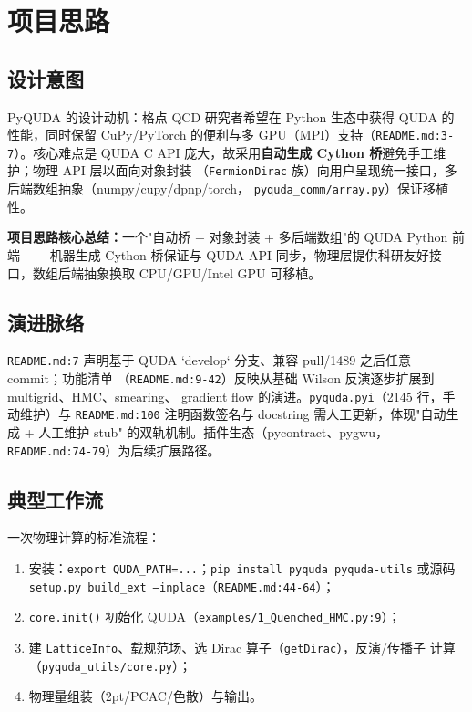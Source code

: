 \documentclass[UTF8]{ctexart}
\begin{document}
\section{项目思路}

\subsection{设计意图}
PyQUDA 的设计动机：格点 QCD 研究者希望在 Python 生态中获得 QUDA 的性能，同时保留
CuPy/PyTorch 的便利与多 GPU（MPI）支持（\texttt{README.md:3-7}）。核心难点是 QUDA C API
庞大，故采用\textbf{自动生成 Cython 桥}避免手工维护；物理 API 层以面向对象封装
（\texttt{FermionDirac} 族）向用户呈现统一接口，多后端数组抽象（numpy/cupy/dpnp/torch，
\texttt{pyquda\_comm/array.py}）保证移植性。

\begin{ideabox}
\textbf{项目思路核心总结：}一个"自动桥 + 对象封装 + 多后端数组"的 QUDA Python 前端——
机器生成 Cython 桥保证与 QUDA API 同步，物理层提供科研友好接口，数组后端抽象换取
CPU/GPU/Intel GPU 可移植。
\end{ideabox}

\subsection{演进脉络}
\texttt{README.md:7} 声明基于 QUDA `develop` 分支、兼容 pull/1489 之后任意 commit；功能清单
（\texttt{README.md:9-42}）反映从基础 Wilson 反演逐步扩展到 multigrid、HMC、smearing、
gradient flow 的演进。\texttt{pyquda.pyi}（2145 行，手动维护）与
\texttt{README.md:100} 注明函数签名与 docstring 需人工更新，体现"自动生成 + 人工维护 stub"
的双轨机制。插件生态（pycontract、pygwu，\texttt{README.md:74-79}）为后续扩展路径。

\subsection{典型工作流}
一次物理计算的标准流程：
\begin{enumerate}
  \item 安装：\texttt{export QUDA\_PATH=...}；\texttt{pip install pyquda pyquda-utils} 或源码
        \texttt{setup.py build\_ext --inplace}（\texttt{README.md:44-64}）；
  \item \texttt{core.init()} 初始化 QUDA（\texttt{examples/1\_Quenched\_HMC.py:9}）；
  \item 建 \texttt{LatticeInfo}、载规范场、选 Dirac 算子（\texttt{getDirac}），反演/传播子
        计算（\texttt{\nolinkurl{pyquda_utils/core.py}}）；
  \item 物理量组装（2pt/PCAC/色散）与输出。
\end{enumerate}
\end{document}
